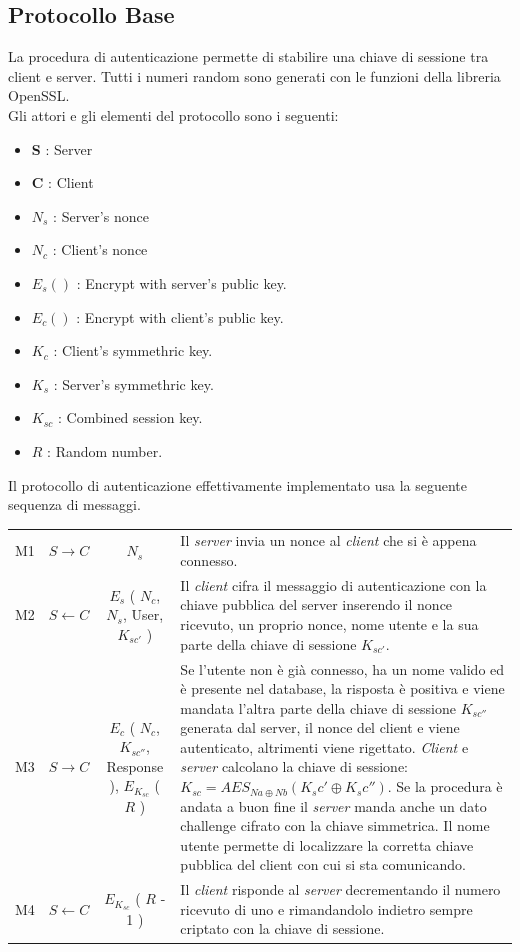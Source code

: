 \documentclass[a4paper,titlepage]{article}
\begin{document}
\subsection{Protocollo Base}
La procedura di autenticazione permette di stabilire una chiave di sessione tra client e server. Tutti i numeri random sono generati con le funzioni della libreria OpenSSL.\\
Gli attori e gli elementi del protocollo sono i seguenti:
\begin{itemize}
\item \textbf{S} : Server
\item \textbf{C} : Client
\item $N_s$ : Server's nonce
\item $N_c$ : Client's nonce
\item $E_{s} ()$ : Encrypt with server's public key. 
\item $E_{c} ()$ : Encrypt with client's public key.
\item $K_c$ : Client's symmethric key.
\item $K_s$ : Server's symmethric key.
\item $K_{sc}$ : Combined session key.
\item $R$ : Random number.
\end{itemize}
Il protocollo di autenticazione effettivamente implementato usa la seguente sequenza di messaggi.
\begin{center}
    \begin{tabular}{  c  c c p{6cm} }
    M1 & $S \rightarrow C$ & $N_s$ & Il \textit{server} invia un nonce al \textit{client} che si è appena connesso. \\
    M2 & $S \leftarrow C$ & $E_{s}$ ( $N_c$, $N_s$, User, $K_{sc'}$ ) & Il \textit{client} cifra il messaggio di autenticazione con la chiave pubblica del server inserendo il nonce ricevuto, un proprio nonce, nome utente e la sua parte della chiave di sessione $K_{sc'}$. \\
    M3 & $S \rightarrow C$ & $E_{c}$ ( $N_c$, $K_{sc''}$, Response ), $E_{K_{sc}}$ ( $R$ )  & Se l'utente non è già connesso, ha un nome valido ed è presente nel database, la risposta è positiva e viene mandata l'altra parte della chiave di sessione $K_{sc''}$ generata dal server, il nonce del client e viene autenticato, altrimenti viene rigettato. \textit{Client} e \textit{server} calcolano la chiave di sessione: $ K_{sc} = AES_{Na \oplus Nb}(K_sc' \oplus K_sc'') $. Se la procedura è andata a buon fine il \textit{server} manda anche un dato challenge cifrato con la chiave simmetrica. Il nome utente permette di localizzare la corretta chiave pubblica del client con cui si sta comunicando.\\
    M4 & $S \leftarrow C$ & $E_{K_{sc}}$ ( $R$ - 1 ) & Il \textit{client} risponde al \textit{server} decrementando il numero ricevuto di uno e rimandandolo indietro sempre criptato con la chiave di sessione. \\   
    \end{tabular}
\end{center}
\end{document}
